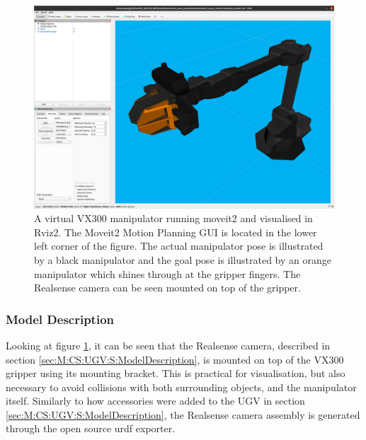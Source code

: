 \begin{figure}[htp]
  \centering
  \includegraphics[width = 1\textwidth]{Figures/figVX300Moveit.png}
  \caption{A virtual VX300 manipulator running moveit2 and visualised in Rviz2. The Moveit2 Motion Planning GUI is located in the lower left corner of the figure. The actual manipulator pose is illustrated by a black manipulator and the goal pose is illustrated by an orange manipulator which shines through at the gripper fingers. The Realsense camera can be seen mounted on top of the gripper.}
  \label{fig:VX300Moveit}
\end{figure}

\subsubsection{Model Description}
Looking at figure \ref{fig:VX300Moveit}, it can be seen that the Realsense camera, described in section \ref{sec:M:CS:UGV:S:ModelDescription}, is mounted on top of the VX300 gripper using its mounting bracket. This is practical for visualisation, but also necessary to avoid collisions with both surrounding objects, and the manipulator itself. Similarly to how accessories were added to the UGV in section \ref{sec:M:CS:UGV:S:ModelDescription}, the Realsense camera assembly is generated through the open source urdf exporter\cite{urdf_exporter}. 

